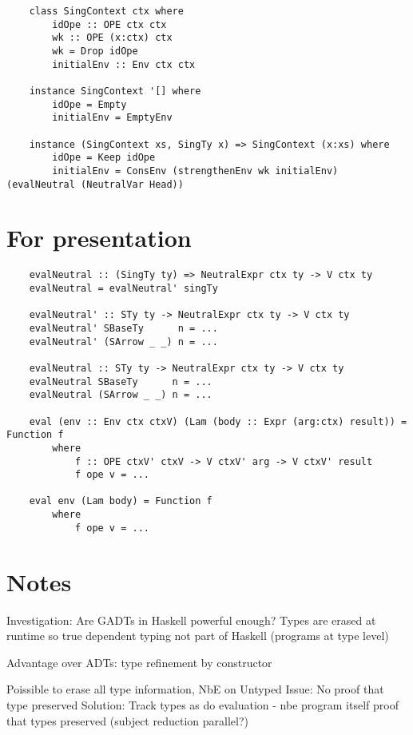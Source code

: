\begin{lstlisting}
    class SingContext ctx where
        idOpe :: OPE ctx ctx
        wk :: OPE (x:ctx) ctx
        wk = Drop idOpe
        initialEnv :: Env ctx ctx

    instance SingContext '[] where
        idOpe = Empty
        initialEnv = EmptyEnv

    instance (SingContext xs, SingTy x) => SingContext (x:xs) where
        idOpe = Keep idOpe
        initialEnv = ConsEnv (strengthenEnv wk initialEnv) (evalNeutral (NeutralVar Head))
\end{lstlisting}

\section{For presentation}

\begin{lstlisting}
    evalNeutral :: (SingTy ty) => NeutralExpr ctx ty -> V ctx ty
    evalNeutral = evalNeutral' singTy

    evalNeutral' :: STy ty -> NeutralExpr ctx ty -> V ctx ty
    evalNeutral' SBaseTy      n = ...
    evalNeutral' (SArrow _ _) n = ...

    evalNeutral :: STy ty -> NeutralExpr ctx ty -> V ctx ty
    evalNeutral SBaseTy      n = ...
    evalNeutral (SArrow _ _) n = ...

    eval (env :: Env ctx ctxV) (Lam (body :: Expr (arg:ctx) result)) = Function f 
        where
            f :: OPE ctxV' ctxV -> V ctxV' arg -> V ctxV' result
            f ope v = ...

    eval env (Lam body) = Function f 
        where
            f ope v = ...
\end{lstlisting}

\section{Notes}

Investigation: Are GADTs in Haskell powerful enough? Types are erased at runtime so true dependent typing not part of Haskell (programs at type level)

Advantage over ADTs: type refinement by constructor

Poissible to erase all type information, NbE on Untyped
Issue: No proof that type preserved 
Solution: Track types as do evaluation - nbe program itself proof that types preserved (subject reduction parallel?)

